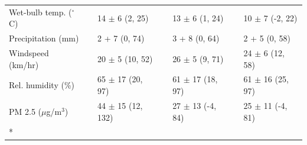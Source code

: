 \begin{longtable}[t]{lllllll}
\hspace{1em}Wet-bulb temp. ($^\circ$C) &  & 14 $\pm$ 6 (2, 25) &  & 13 $\pm$ 6 (1, 24) &  & 10 $\pm$ 7 (-2, 22)\\
\hspace{1em}Precipitation (mm) &  & 2 + 7 (0, 74) &  & 3 + 8 (0, 64) &  & 2 + 5 (0, 58)\\
\hspace{1em}Windspeed (km/hr) &  & 20 $\pm$ 5 (10, 52) &  & 26 $\pm$ 5 (9, 71) &  & 24 $\pm$ 6 (12, 58)\\
\hspace{1em}Rel. humidity (\%) &  & 65 $\pm$ 17 (20, 97) &  & 61 $\pm$ 17 (18, 97) &  & 61 $\pm$ 16 (25, 97)\\
\hspace{1em}PM 2.5 ($\mu$g/m$^{3}$) &  & 44 $\pm$ 15 (12, 132) &  & 27 $\pm$ 13 (-4, 84) &  & 25 $\pm$ 11 (-4, 81)\\*
\end{longtable}
\endgroup{}
